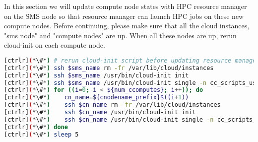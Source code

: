         In this section we will update compute node states with HPC resource manager on the SMS node so that resource manager can launch HPC jobs on these new compute nodes.
        Before continuing, please make sure that all the cloud instances, "sms node" and "compute nodes" are up. When all these nodes are up, rerun cloud-init on each compute node.



\begin{lstlisting}[language=bash,keywords={}]
[ctrlr](*\#*) # rerun cloud-init script before updating resource manager
[ctrlr](*\#*) ssh $sms_name rm -fr /var/lib/cloud/instances
[ctrlr](*\#*) ssh $sms_name /usr/bin/cloud-init init
[ctrlr](*\#*) ssh $sms_name /usr/bin/cloud-init single -n cc_scripts_user
[ctrlr](*\#*) for ((i=0; i < ${num_ccomputes}; i++)); do
[ctrlr](*\#*)    cn_name=${cnodename_prefix}$((i+1))
[ctrlr](*\#*)    ssh $cn_name rm -fr /var/lib/cloud/instances
[ctrlr](*\#*)    ssh $cn_name /usr/bin/cloud-init init
[ctrlr](*\#*)    ssh $cn_name /usr/bin/cloud-init single -n cc_scripts_user
[ctrlr](*\#*) done
[ctrlr](*\#*) sleep 5
\end{lstlisting}
